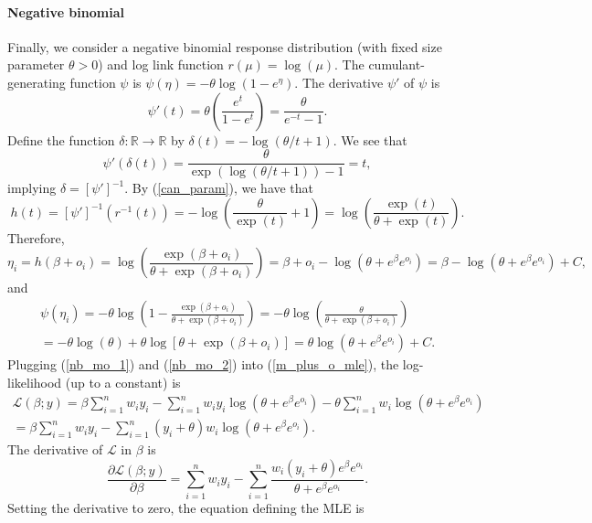 \documentclass[12pt]{article}
\begin{document}
\begin{appendices}
\begin{refsection}
		\paragraph{Negative binomial}
		Finally, we consider a negative binomial response distribution (with fixed size parameter $\theta > 0$) and log link function $r(\mu) = \log(\mu)$. The cumulant-generating function $\psi$ is
		$\psi(\eta) = -\theta \log(1 - e^\eta).$ The derivative $\psi'$ of $\psi$ is
		$$ \psi'(t) = \theta \left(\frac{e^t}{1 - e^t}\right) = \frac{\theta}{e^{-t} - 1}.$$ Define the function $\delta: \mathbb{R} \to \mathbb{R}$ by $\delta(t) = -\log\left(\theta/t + 1 \right).$ We see that
		$$\psi'(\delta(t)) = \frac{\theta}{\exp\left(\log(\theta/t + 1 )\right) - 1} = t,$$ implying $\delta = [\psi']^{-1}.$ By (\ref{can_param}), we have that
		$$
		h(t) = [\psi']^{-1}(r^{-1}(t)) = -\log\left(\frac{\theta}{\exp(t)} + 1 \right) = \log\left(\frac{\exp(t)}{\theta + \exp(t)}\right).
		$$
		Therefore,
		\begin{equation}\label{nb_mo_1}
		\eta_i = h(\beta + o_i) = \log\left(\frac{\exp(\beta+o_i)}{\theta + \exp(\beta + o_i)} \right) = \beta + o_i - \log\left(\theta + e^{\beta}e^{o_i}\right) = \beta - \log\left(\theta + e^{\beta}e^{o_i} \right) + C,
		\end{equation}
		and
		\begin{multline}\label{nb_mo_2}
		\psi(\eta_i) = -\theta\log\left(1 - \frac{\exp(\beta+o_i)}{\theta + \exp(\beta + o_i)} \right) = -\theta \log \left(\frac{\theta}{\theta + \exp(\beta + o_i)} \right) \\ = -\theta \log (\theta) + \theta \log[\theta + \exp(\beta + o_i)] = \theta \log(\theta + e^{\beta}e^{o_i}) + C.
		\end{multline}
		Plugging (\ref{nb_mo_1}) and (\ref{nb_mo_2}) into (\ref{m_plus_o_mle}), the log-likelihood (up to a constant) is
		\begin{multline*}
		\mathcal{L}(\beta; y) = \beta \sum_{i=1}^n w_i y_i - \sum_{i=1}^n w_i y_i \log(\theta + e^\beta e^{o_i}) - \theta \sum_{i=1}^n w_i \log(\theta + e^\beta  e^{o_i}) \\ = \beta \sum_{i=1}^n w_i y_i - \sum_{i=1}^n (y_i + \theta)w_i\log(\theta + e^\beta e^{o_i}).
		\end{multline*}
		The derivative of $\mathcal{L}$ in $\beta$ is
		$$\frac{\partial \mathcal{L}(\beta;y)}{\partial \beta} = \sum_{i=1}^n w_i y_i  - \sum_{i=1}^n \frac{w_i(y_i + \theta) e^{\beta} e^{o_i}}{ \theta + e^{\beta} e^{o_i}}.$$
		Setting the derivative to zero, the equation defining the MLE is

\end{refsection}
\end{appendices}
\end{document}
